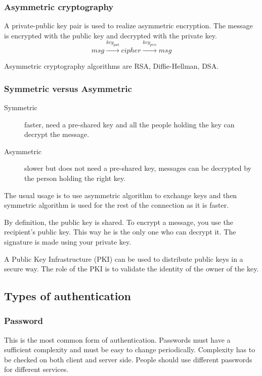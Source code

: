 \subsubsection{Asymmetric cryptography}
A private-public key pair is used to realize asymmetric encryption. The
message is encrypted with the public key and decrypted with the private key.
\[ msg \xrightarrow{key_{pub}} cipher \xrightarrow{key_{priv}} msg \]

Asymmetric cryptography algorithms are RSA, Diffie-Hellman, DSA.

\subsubsection{Symmetric versus Asymmetric}

\begin{description}
\item[Symmetric]
faster, need a pre-shared key and all the people holding the key can
decrypt the message.
\item[Asymmetric]
slower but does not need a pre-shared key, messages can be decrypted by the
person holding the right key.
\end{description}

The usual usage is to use asymmetric algorithm to exchange keys and then
symmetric algorithm is used for the rest of the connection as it is faster.

By definition, the public key is shared.
To encrypt a message, you use the recipient's public key. This way he is the
only one who can decrypt it. The signature is made using your private key.

A Public Key Infrastructure (PKI) can be used to distribute public keys in a
secure way. The role of the PKI is to validate the identity of the owner of
the key.

\subsection{Types of authentication}

\subsubsection{Password}
This is the most common form of authentication.
Passwords must have a sufficient complexity and must be easy to change
periodically.
Complexity has to be checked on both client and server side.
People should use different passwords for different services.

